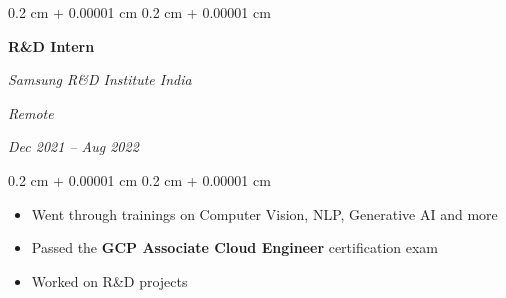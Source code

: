 \documentclass[10pt, letterpaper]{article}
\newenvironment{highlights}{
    \begin{itemize}[
        topsep=0.10 cm,
        parsep=0.10 cm,
        partopsep=0pt,
        itemsep=0pt,
        leftmargin=0.4 cm + 10pt
    ]
}{
    \end{itemize}
} %
\newenvironment{onecolentry}{
    \begin{adjustwidth}{
        0.2 cm + 0.00001 cm
    }{
        0.2 cm + 0.00001 cm
    }
}{
    \end{adjustwidth}
} %
\newenvironment{twocolentry}[2][]{
    \onecolentry
    \def\secondColumn{#2}
    \setcolumnwidth{\fill, 4.5 cm}
    \begin{paracol}{2}
}{
    \switchcolumn \raggedleft \secondColumn
    \end{paracol}
    \endonecolentry
} %
\let\hrefWithoutArrow\href
\renewcommand{\href}[2]{\hrefWithoutArrow{#1}{\ifthenelse{\equal{#2}{}}{ }{#2 }\raisebox{.15ex}{\footnotesize \faExternalLink*}}}
\begin{document}
        \vspace{0.2 cm}

        \begin{twocolentry}{
        \textit{Remote}    
            
        \textit{Dec 2021 – Aug 2022}}
            \textbf{R\&D Intern}
            
            \textit{Samsung R\&D Institute India}
        \end{twocolentry}

        \vspace{0.10 cm}
        \begin{onecolentry}
            \begin{highlights}
                \item Went through trainings on Computer Vision, NLP, Generative AI and more
                \item Passed the \textbf{GCP Associate Cloud Engineer} certification exam
                \item Worked on R\&D projects
            \end{highlights}
        \end{onecolentry}

        \vspace{0.2 cm}
        




\end{document}
